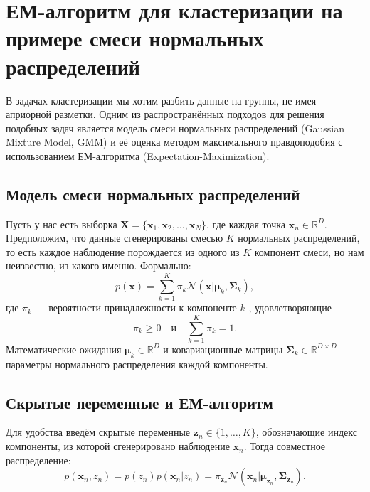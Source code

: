\section{ЕМ-алгоритм для кластеризации на примере смеси нормальных распределений}

В задачах кластеризации мы хотим разбить данные на группы, не имея априорной разметки. Одним из распространённых подходов для решения подобных задач является модель смеси нормальных распределений (Gaussian Mixture Model, GMM) и её оценка методом максимального правдоподобия с использованием ЕМ-алгоритма (Expectation-Maximization).

\subsection{Модель смеси нормальных распределений}

Пусть у нас есть выборка $\mathbf{X} = \{\mathbf{x}_1, \mathbf{x}_2, \ldots, \mathbf{x}_N\}$, где каждая точка $\mathbf{x}_n \in \mathbb{R}^D$. Предположим, что данные сгенерированы смесью $K$ нормальных распределений, то есть каждое наблюдение порождается из одного из $K$ компонент смеси, но нам неизвестно, из какого именно. Формально:
\begin{equation*}
p(\mathbf{x}) = \sum_{k=1}^{K} \pi_k \mathcal{N}(\mathbf{x}|\boldsymbol{\mu}_k, \boldsymbol{\Sigma}_k),
\end{equation*} 
где $\pi_k$ --- вероятности принадлежности к компоненте $k$ , удовлетворяющие 
\begin{equation*}
\pi_k \geq 0 \quad \text{и} \quad \sum_{k=1}^K \pi_k = 1.
\end{equation*} 
Математические ожидания $\boldsymbol{\mu}_k \in \mathbb{R}^D$ и ковариационные матрицы $\boldsymbol{\Sigma}_k \in \mathbb{R}^{D \times D}$ --- параметры нормального распределения каждой компоненты.

\subsection{Скрытые переменные и ЕМ-алгоритм}

Для удобства введём скрытые переменные $\mathbf{z}_n \in \{1,\ldots,K\}$, обозначающие индекс компоненты, из которой сгенерировано наблюдение $\mathbf{x}_n$. Тогда совместное распределение:
\begin{equation*}
p(\mathbf{x}_n, z_n) = p(z_n) p(\mathbf{x}_n | z_n) = \pi_{\mathbf{z}_n} \mathcal{N}(\mathbf{x}_n|\boldsymbol{\mu}_{\mathbf{z}_n}, \boldsymbol{\Sigma}_{\mathbf{z}_n}).
\end{equation*}

